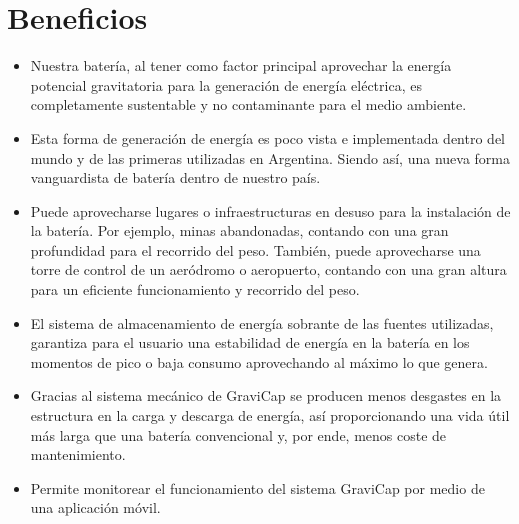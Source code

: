     \section{Beneficios}
        \begin{itemize}
            \item Nuestra batería, al tener como factor principal aprovechar la energía potencial gravitatoria para la generación de energía eléctrica, es completamente sustentable y no contaminante para el medio ambiente.\par
            \item Esta forma de generación de energía es poco vista e implementada dentro del mundo y de las primeras utilizadas en Argentina. Siendo así, una nueva forma vanguardista de batería dentro de nuestro país.
            \item Puede aprovecharse lugares o infraestructuras en desuso para la instalación de la batería. Por ejemplo, minas abandonadas, contando con una gran profundidad para el recorrido del peso. También, puede aprovecharse una torre de control de un aeródromo o aeropuerto, contando con una gran altura para un eficiente funcionamiento y recorrido del peso. 
            \item El sistema de almacenamiento de energía sobrante de las fuentes utilizadas, garantiza para el usuario una estabilidad de energía en la batería en los momentos de pico o baja consumo aprovechando al máximo lo que genera.
            \item Gracias al sistema mecánico de \textcolor{dark_violet}{GraviCap} se producen menos desgastes en la estructura en la carga y descarga de energía, así proporcionando una vida útil más larga que una batería convencional y, por ende, menos coste de mantenimiento. 
            \item Permite monitorear el funcionamiento del sistema \textcolor{dark_violet}{GraviCap} por medio de una aplicación móvil.
        
        \end{itemize}